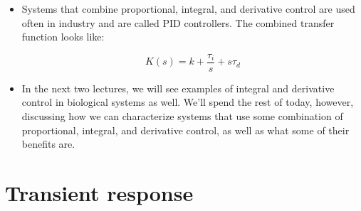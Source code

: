 \documentclass{article}
\begin{document}
\begin{itemize}

\item Systems that combine proportional, integral, and derivative control are used often in industry and are called PID controllers. The combined transfer function looks like:

\[ K(s) = k + \frac{\tau_i}{s} + s \tau_d   \]

\item In the next two lectures, we will see examples of integral and derivative control in biological systems as well. We'll spend the rest of today, however, discussing how we can characterize systems that use some combination of proportional, integral, and derivative control, as well as what some of their benefits are.
\end{itemize}

\section*{Transient response}
\end{document}
